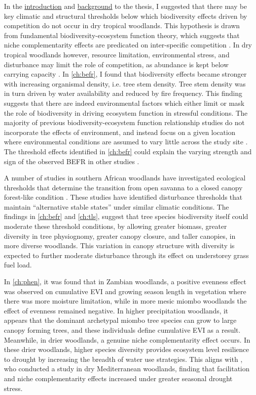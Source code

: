 \begin{refsection}
In the \hyperref[ch:intro]{introduction} and \hyperref[ch:background]{background} to the thesis, I suggested that there may be key climatic and structural thresholds below which biodiversity effects driven by competition do not occur in dry tropical woodlands. This hypothesis is drawn from fundamental biodiversity-ecosystem function theory, which suggests that niche complementarity effects are predicated on inter-specific competition \citep{Isbell2013}. In dry tropical woodlands however, resource limitation, environmental stress, and disturbance may limit the role of competition, as abundance is kept below carrying capacity \citep{Sankaran2005}. In \autoref{ch:befr}, I found that biodiversity effects became stronger with increasing organismal density, i.e. tree stem density. Tree stem density was in turn driven by water availability and reduced by fire frequency. This finding suggests that there are indeed environmental factors which either limit or mask the role of biodiversity in driving ecosystem function in stressful conditions. The majority of previous biodiversity-ecosystem function relationship studies do not incorporate the effects of environment, and instead focus on a given location where environmental conditions are assumed to vary little across the study site \citep{Cardinale2009, Plas2019}. The threshold effects identified in \autoref{ch:befr} could explain the varying strength and sign of the observed BEFR in other studies \citep{Liang2016}.

A number of studies in southern African woodlands have investigated ecological thresholds that determine the transition from open savanna to a closed canopy forest-like condition \citep{Staver2011, Hirota2011, Staver2017}. These studies have identified disturbance thresholds that maintain ``alternative stable states'' under similar climatic conditions. The findings in \autoref{ch:befr} and \autoref{ch:tls}, suggest that tree species biodiversity itself could moderate these threshold conditions, by allowing greater biomass, greater diversity in tree physiognomy, greater canopy closure, and taller canopies, in more diverse woodlands. This variation in canopy structure with diversity is expected to further moderate disturbance through its effect on understorey grass fuel load.

In \autoref{ch:phen}, it was found that in Zambian woodlands, a positive evenness effect was observed on cumulative EVI and growing season length in vegetation where there was more moisture limitation, while in more mesic miombo woodlands the effect of evenness remained negative. In higher precipitation woodlands, it appears that the dominant archetypal miombo tree species can grow to large canopy forming trees, and these individuals define cumulative EVI as a result. Meanwhile, in drier woodlands, a genuine niche complementarity effect occurs. In these drier woodlands, higher species diversity provides ecosystem level resilience to drought by increasing the breadth of water use strategies. This aligns with \citet{Ratcliffe2017}, who conducted a study in dry Mediterranean woodlands, finding that facilitation and niche complementarity effects increased under greater seasonal drought stress.


\end{refsection}
